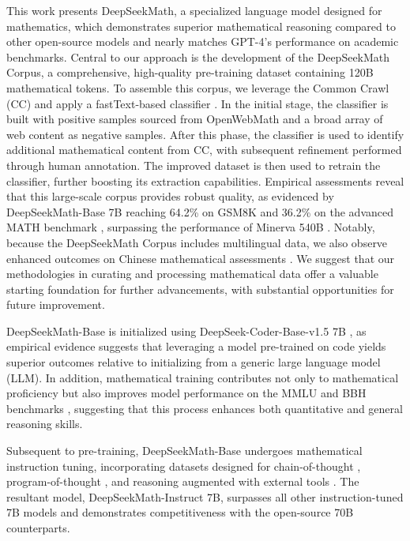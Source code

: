 This work presents DeepSeekMath, a specialized language model designed for mathematics, which demonstrates superior mathematical reasoning compared to other open-source models and nearly matches GPT-4’s performance on academic benchmarks. Central to our approach is the development of the DeepSeekMath Corpus, a comprehensive, high-quality pre-training dataset containing 120B mathematical tokens. To assemble this corpus, we leverage the Common Crawl (CC) and apply a fastText-based classifier \citep{joulin2016fasttext}. In the initial stage, the classifier is built with positive samples sourced from OpenWebMath \citep{openwebmath} and a broad array of web content as negative samples. After this phase, the classifier is used to identify additional mathematical content from CC, with subsequent refinement performed through human annotation. The improved dataset is then used to retrain the classifier, further boosting its extraction capabilities. Empirical assessments reveal that this large-scale corpus provides robust quality, as evidenced by DeepSeekMath-Base 7B reaching 64.2\% on GSM8K \citep{gsm8k} and 36.2\% on the advanced MATH benchmark \citep{MATH}, surpassing the performance of Minerva 540B \citep{minerva}. Notably, because the DeepSeekMath Corpus includes multilingual data, we also observe enhanced outcomes on Chinese mathematical assessments \citep{wei2023cmath,agieval}. We suggest that our methodologies in curating and processing mathematical data offer a valuable starting foundation for further advancements, with substantial opportunities for future improvement.

DeepSeekMath-Base is initialized using DeepSeek-Coder-Base-v1.5 7B \citep{deepseek-coder}, as empirical evidence suggests that leveraging a model pre-trained on code yields superior outcomes relative to initializing from a generic large language model (LLM). In addition, mathematical training contributes not only to mathematical proficiency but also improves model performance on the MMLU \citep{mmlu} and BBH benchmarks \citep{bbh}, suggesting that this process enhances both quantitative and general reasoning skills.

Subsequent to pre-training, DeepSeekMath-Base undergoes mathematical instruction tuning, incorporating datasets designed for chain-of-thought \citep{cot}, program-of-thought \citep{pot,pal}, and reasoning augmented with external tools \citep{tora}. The resultant model, DeepSeekMath-Instruct 7B, surpasses all other instruction-tuned 7B models and demonstrates competitiveness with the open-source 70B counterparts.


